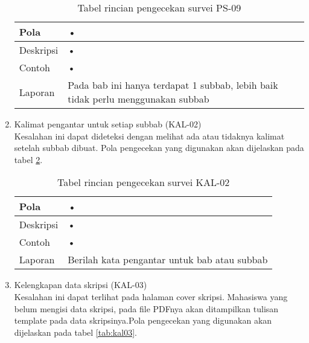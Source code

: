 \begin{enumerate}
	\begin{table}[H]
		\renewcommand{\arraystretch}{1.5}
		\caption {Tabel rincian pengecekan survei PS-09} 
		\label{tab:ps09}
		\begin{center}
			\begin{tabular}{|p{3.5cm} |p{10.5cm}|}
			\hline 
			Pola & • \\ 
			\hline 
			Deskripsi & • \\ 
			\hline 
			Contoh & • \\ 
			\hline 
			Laporan & Pada bab ini hanya terdapat 1 subbab, lebih baik tidak perlu menggunakan subbab \\ 
			\hline
			\end{tabular}
		\end{center}
	\end{table}
	
	\item Kalimat pengantar untuk setiap subbab (KAL-02) \\
	Kesalahan ini dapat dideteksi dengan melihat ada atau tidaknya kalimat setelah subbab dibuat. Pola pengecekan yang digunakan akan dijelaskan pada tabel \ref{tab:kal02}.
		
	\begin{table}[H]
		\renewcommand{\arraystretch}{1.5}
		\caption {Tabel rincian pengecekan survei KAL-02} 
		\label{tab:kal02}
		\begin{center}
			\begin{tabular}{|p{3.5cm} |p{10.5cm}|}
			\hline 
			Pola & • \\ 
			\hline 
			Deskripsi & • \\ 
			\hline 
			Contoh & • \\ 
			\hline 
			Laporan & Berilah kata pengantar untuk bab atau subbab \\ 
			\hline
			\end{tabular}
		\end{center}
	\end{table}
	
	\item Kelengkapan data skripsi (KAL-03) \\
	Kesalahan ini dapat terlihat pada halaman cover skripsi. Mahasiswa yang belum mengisi data skripsi, pada file PDFnya akan ditampilkan tulisan template pada data skripsinya.Pola pengecekan yang digunakan akan dijelaskan pada tabel \ref{tab:kal03}.
		

\end{enumerate}
